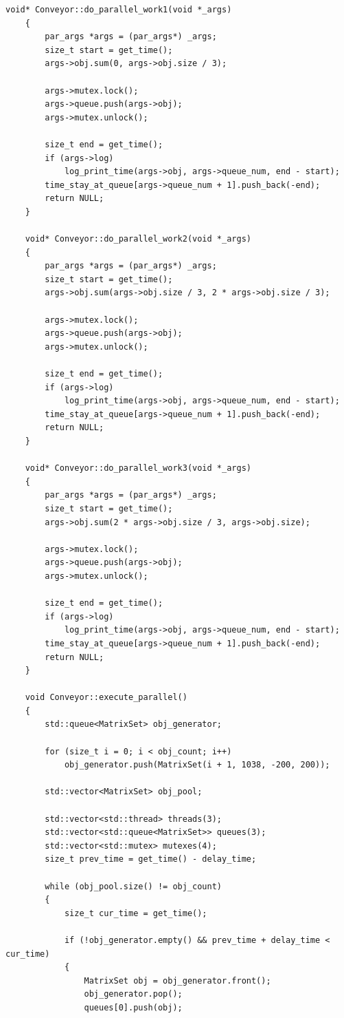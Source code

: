 \documentclass[12pt, a4paper]{report}
\begin{document}
	\begin{lstlisting}[label=code:par,caption=Реализация параллельной обработки матрицы]
	void* Conveyor::do_parallel_work1(void *_args)
	{
		par_args *args = (par_args*) _args;
		size_t start = get_time();
		args->obj.sum(0, args->obj.size / 3);
		
		args->mutex.lock();
		args->queue.push(args->obj);
		args->mutex.unlock();
		
		size_t end = get_time();
		if (args->log)
			log_print_time(args->obj, args->queue_num, end - start);
		time_stay_at_queue[args->queue_num + 1].push_back(-end);
		return NULL;
	}
	
	void* Conveyor::do_parallel_work2(void *_args)
	{
		par_args *args = (par_args*) _args;
		size_t start = get_time();
		args->obj.sum(args->obj.size / 3, 2 * args->obj.size / 3);
		
		args->mutex.lock();
		args->queue.push(args->obj);
		args->mutex.unlock();
		
		size_t end = get_time();
		if (args->log)
			log_print_time(args->obj, args->queue_num, end - start);
		time_stay_at_queue[args->queue_num + 1].push_back(-end);
		return NULL;
	}
	
	void* Conveyor::do_parallel_work3(void *_args)
	{
		par_args *args = (par_args*) _args;
		size_t start = get_time();
		args->obj.sum(2 * args->obj.size / 3, args->obj.size);
		
		args->mutex.lock();
		args->queue.push(args->obj);
		args->mutex.unlock();
		
		size_t end = get_time();
		if (args->log)
			log_print_time(args->obj, args->queue_num, end - start);
		time_stay_at_queue[args->queue_num + 1].push_back(-end);
		return NULL;
	}
	
	void Conveyor::execute_parallel()
	{
		std::queue<MatrixSet> obj_generator;
		
		for (size_t i = 0; i < obj_count; i++)
			obj_generator.push(MatrixSet(i + 1, 1038, -200, 200));
		
		std::vector<MatrixSet> obj_pool;
		
		std::vector<std::thread> threads(3);
		std::vector<std::queue<MatrixSet>> queues(3);
		std::vector<std::mutex> mutexes(4);
		size_t prev_time = get_time() - delay_time;
		
		while (obj_pool.size() != obj_count)
		{
			size_t cur_time = get_time();
			
			if (!obj_generator.empty() && prev_time + delay_time < cur_time)
			{
				MatrixSet obj = obj_generator.front();
				obj_generator.pop();
				queues[0].push(obj);
			

\end{lstlisting}
\end{document}
